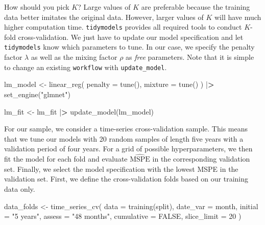 \documentclass[
]{krantz}
\newenvironment{Shaded}{\begin{snugshade}}{\end{snugshade}}
\newcommand{\AttributeTok}[1]{\textcolor[rgb]{0.61,0.61,0.61}{#1}}
\newcommand{\ConstantTok}[1]{\textcolor[rgb]{0,0,0}{#1}}
\newcommand{\DecValTok}[1]{\textcolor[rgb]{0.06,0.06,0.06}{#1}}
\newcommand{\ErrorTok}[1]{\textcolor[rgb]{0.14,0.14,0.14}{\textbf{#1}}}
\newcommand{\FunctionTok}[1]{\textcolor[rgb]{0,0,0}{#1}}
\newcommand{\NormalTok}[1]{#1}
\newcommand{\OtherTok}[1]{\textcolor[rgb]{0.37,0.37,0.37}{#1}}
\newcommand{\SpecialCharTok}[1]{\textcolor[rgb]{0,0,0}{#1}}
\newcommand{\StringTok}[1]{\textcolor[rgb]{0.5,0.5,0.5}{#1}}
\begin{document}
How should you pick \(K\)? Large values of \(K\) are preferable because the training data better imitates the original data. However, larger values of \(K\) will have much higher computation time.
\texttt{tidymodels} provides all required tools to conduct \(K\)-fold cross-validation. We just have to update our model specification and let \texttt{tidymodels} know which parameters to tune. In our case, we specify the penalty factor \(\lambda\) as well as the mixing factor \(\rho\) as \emph{free} parameters. Note that it is simple to change an existing \texttt{workflow} with \texttt{update\_model}.

\begin{Shaded}
\begin{Highlighting}[]
\NormalTok{lm\_model }\OtherTok{\textless{}{-}} \FunctionTok{linear\_reg}\NormalTok{(}
  \AttributeTok{penalty =} \FunctionTok{tune}\NormalTok{(),}
  \AttributeTok{mixture =} \FunctionTok{tune}\NormalTok{()}
\NormalTok{) }\SpecialCharTok{|}\ErrorTok{\textgreater{}}
  \FunctionTok{set\_engine}\NormalTok{(}\StringTok{"glmnet"}\NormalTok{)}

\NormalTok{lm\_fit }\OtherTok{\textless{}{-}}\NormalTok{ lm\_fit }\SpecialCharTok{|}\ErrorTok{\textgreater{}}
  \FunctionTok{update\_model}\NormalTok{(lm\_model)}
\end{Highlighting}
\end{Shaded}

For our sample, we consider a time-series cross-validation sample. This means that we tune our models with 20 random samples of length five years with a validation period of four years. For a grid of possible hyperparameters, we then fit the model for each fold and evaluate \(\hat{\text{MSPE}}\) in the corresponding validation set. Finally, we select the model specification with the lowest MSPE in the validation set. First, we define the cross-validation folds based on our training data only.

\begin{Shaded}
\begin{Highlighting}[]
\NormalTok{data\_folds }\OtherTok{\textless{}{-}} \FunctionTok{time\_series\_cv}\NormalTok{(}
  \AttributeTok{data        =} \FunctionTok{training}\NormalTok{(split),}
  \AttributeTok{date\_var    =}\NormalTok{ month,}
  \AttributeTok{initial     =} \StringTok{"5 years"}\NormalTok{,}
  \AttributeTok{assess      =} \StringTok{"48 months"}\NormalTok{,}
  \AttributeTok{cumulative  =} \ConstantTok{FALSE}\NormalTok{,}
  \AttributeTok{slice\_limit =} \DecValTok{20}
\NormalTok{)}
\end{Highlighting}
\end{Shaded}
\end{document}
